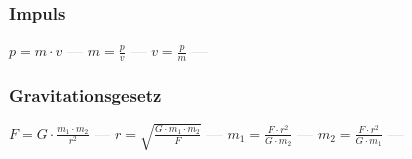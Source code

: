 \subsubsection{Impuls} 
\begin{minipage}{0.45\textwidth} 
\end{minipage} 
\begin{minipage}{0.45\textwidth} 
 
\end{minipage} 
$ p = m\cdot v $ \textcolor{lightgray}{\textbf{---}} 
$ m = \frac{p}{v} $ \textcolor{lightgray}{\textbf{---}} 
$ v = \frac{p}{m} $ \textcolor{lightgray}{\textbf{---}} 

\subsubsection{Gravitationsgesetz} 
\begin{minipage}{0.45\textwidth} 
\end{minipage} 
\begin{minipage}{0.45\textwidth} 
 
\end{minipage} 
$ F = G \cdot  \frac{m_{1} \cdot m_{2} }{  r^{2} } $ \textcolor{lightgray}{\textbf{---}} 
$ r = \sqrt{\frac{G\cdot m_{1} \cdot m_{2} }{   F}} $ \textcolor{lightgray}{\textbf{---}} 
$ m_{1}  =  \frac{F\cdot r^{2} }{G\cdot m_{2} } $ \textcolor{lightgray}{\textbf{---}} 
$ m_{2}  =  \frac{F\cdot r^{2} }{G\cdot m_{1} } $ \textcolor{lightgray}{\textbf{---}} 


